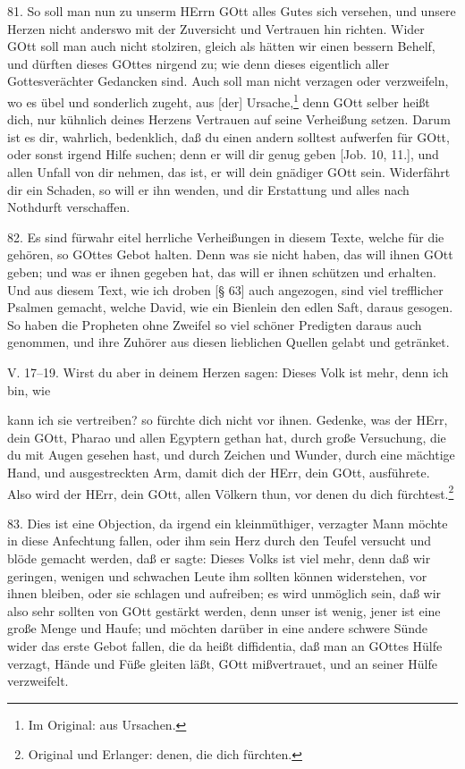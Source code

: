 81. So soll man nun zu unserm HErrn GOtt alles Gutes sich versehen, und unsere Herzen nicht anderswo mit der Zuversicht und Vertrauen hin richten. Wider GOtt soll man auch nicht stolziren, gleich als hätten wir einen bessern Behelf, und dürften dieses GOttes nirgend zu; wie denn dieses eigentlich aller Gottesverächter Gedancken sind. Auch soll man nicht verzagen oder verzweifeln, wo es übel und sonderlich zugeht, aus [der] Ursache,\footnote{Im Original: aus Ursachen.} denn GOtt selber heißt dich, nur kühnlich deines Herzens Vertrauen auf seine Verheißung setzen. Darum ist es dir, wahrlich, bedenklich, daß du einen andern solltest aufwerfen für GOtt, oder sonst irgend Hilfe suchen; denn er will dir genug geben [Job. 10, 11.], und allen Unfall von dir nehmen, das ist, er will dein gnädiger GOtt sein. Widerfährt dir ein Schaden, so will er ihn wenden, und dir Erstattung und alles nach Nothdurft verschaffen.

82. Es sind fürwahr eitel herrliche Verheißungen in diesem Texte, welche für die gehören, so GOttes Gebot halten. Denn was sie nicht haben, das will ihnen GOtt geben; und was er ihnen gegeben hat, das will er ihnen schützen und erhalten. Und aus diesem Text, wie ich droben [§ 63] auch angezogen, sind viel trefflicher Psalmen gemacht, welche David, wie ein Bienlein den edlen Saft, daraus gesogen. So haben die Propheten ohne Zweifel so viel schöner Predigten daraus auch genommen, und ihre Zuhörer aus diesen lieblichen Quellen gelabt und getränket.

\begin{schriftzitat}
V. 17–19. Wirst du aber in deinem Herzen sagen: Dieses Volk ist mehr, denn ich bin, wie
\end{schriftzitat}

kann ich sie vertreiben? so fürchte dich nicht vor ihnen. Gedenke, was der HErr, dein GOtt, Pharao und allen Egyptern gethan hat, durch große Versuchung, die du mit Augen gesehen hast, und durch Zeichen und Wunder, durch eine mächtige Hand, und ausgestreckten Arm, damit dich der HErr, dein GOtt, ausführete. Also wird der HErr, dein GOtt, allen Völkern thun, vor denen du dich fürchtest.\footnote{Original und Erlanger: denen, die dich fürchten.}

83. Dies ist eine Objection, da irgend ein kleinmüthiger, verzagter Mann möchte in diese Anfechtung fallen, oder ihm sein Herz durch den Teufel versucht und blöde gemacht werden, daß er sagte: Dieses Volks ist viel mehr, denn daß wir geringen, wenigen und schwachen Leute ihm sollten können widerstehen, vor ihnen bleiben, oder sie schlagen und aufreiben; es wird unmöglich sein, daß wir also sehr sollten von GOtt gestärkt werden, denn unser ist wenig, jener ist eine große Menge und Haufe; und möchten darüber in eine andere schwere Sünde wider das erste Gebot fallen, die da heißt diffidentia, daß man an GOttes Hülfe verzagt, Hände und Füße gleiten läßt, GOtt mißvertrauet, und an seiner Hülfe verzweifelt.

